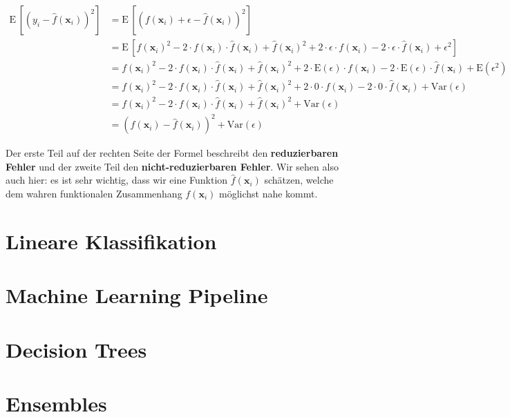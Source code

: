 \documentclass[
]{book}
\begin{document}
\begin{align}
\text{E}\,\left[\left(y_i - \hat{f}(\mathbf{x}_i)\right)^2\right] &= \text{E}\,\left[\left(f(\mathbf{x}_i) + \epsilon - \hat{f}(\mathbf{x}_i)\right)^2\right] \\
&= \text{E}\,\left[f(\mathbf{x}_i)^2 - 2 \cdot f(\mathbf{x}_i) \cdot \hat{f}(\mathbf{x}_i) + \hat{f}(\mathbf{x}_i)^2 + 2 \cdot \epsilon \cdot f(\mathbf{x}_i) - 2 \cdot \epsilon \cdot \hat{f}(\mathbf{x}_i) + \epsilon^2 \right] \\
&= f(\mathbf{x}_i)^2 - 2 \cdot f(\mathbf{x}_i) \cdot \hat{f}(\mathbf{x}_i) + \hat{f}(\mathbf{x}_i)^2 + 2 \cdot \text{E}(\epsilon) \cdot f(\mathbf{x}_i) - 2 \cdot \text{E}(\epsilon) \cdot \hat{f}(\mathbf{x}_i) + \text{E}(\epsilon^2) \\
&= f(\mathbf{x}_i)^2 - 2 \cdot f(\mathbf{x}_i) \cdot \hat{f}(\mathbf{x}_i) + \hat{f}(\mathbf{x}_i)^2 + 2 \cdot 0 \cdot f(\mathbf{x}_i) - 2 \cdot 0 \cdot \hat{f}(\mathbf{x}_i) + \text{Var}(\epsilon) \\
&= f(\mathbf{x}_i)^2 - 2 \cdot f(\mathbf{x}_i) \cdot \hat{f}(\mathbf{x}_i) + \hat{f}(\mathbf{x}_i)^2 + \text{Var}(\epsilon) \\
&= \left(f(\mathbf{x}_i) - \hat{f}(\mathbf{x}_i)\right)^2 + \text{Var}(\epsilon)
\end{align}

Der erste Teil auf der rechten Seite der Formel beschreibt den \textbf{reduzierbaren Fehler} und der zweite Teil den \textbf{nicht-reduzierbaren Fehler}. Wir sehen also auch hier: es ist sehr wichtig, dass wir eine Funktion \(\hat{f}(\mathbf{x}_i)\) schätzen, welche dem wahren funktionalen Zusammenhang \(f(\mathbf{x}_i)\) möglichst nahe kommt.

\hypertarget{lin-class}{%
\chapter{Lineare Klassifikation}\label{lin-class}}

\hypertarget{ml-pipeline}{%
\chapter{Machine Learning Pipeline}\label{ml-pipeline}}

\hypertarget{trees}{%
\chapter{Decision Trees}\label{trees}}

\hypertarget{ensembles}{%
\chapter{Ensembles}\label{ensembles}}
\end{document}

